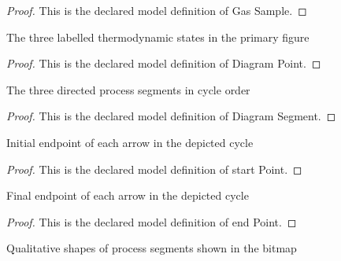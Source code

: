 \begin{proof}
  This is the declared model definition of Gas Sample.
\end{proof}
\begin{definition}
  \label{def:physics:phyx-mini-0343:phyxminiproblems-problemphyxmini0343-diagrampoint}
  The three labelled thermodynamic states in the primary figure
\end{definition}
\begin{proof}
  This is the declared model definition of Diagram Point.
\end{proof}
\begin{definition}
  \label{def:physics:phyx-mini-0343:phyxminiproblems-problemphyxmini0343-diagramsegment}
  The three directed process segments in cycle order
\end{definition}
\begin{proof}
  This is the declared model definition of Diagram Segment.
\end{proof}
\begin{definition}
  \label{def:physics:phyx-mini-0343:phyxminiproblems-problemphyxmini0343-diagramsegment-startpoint}
  Initial endpoint of each arrow in the depicted cycle
\end{definition}
\begin{proof}
  This is the declared model definition of start Point.
\end{proof}
\begin{definition}
  \label{def:physics:phyx-mini-0343:phyxminiproblems-problemphyxmini0343-diagramsegment-endpoint}
  Final endpoint of each arrow in the depicted cycle
\end{definition}
\begin{proof}
  This is the declared model definition of end Point.
\end{proof}
\begin{definition}
  \label{def:physics:phyx-mini-0343:phyxminiproblems-problemphyxmini0343-segmentshape}
  Qualitative shapes of process segments shown in the bitmap
\end{definition}
